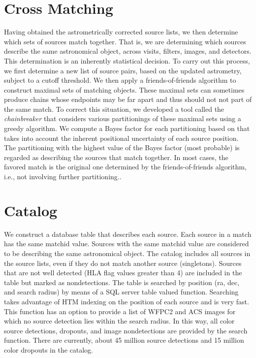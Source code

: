 \documentclass[11pt,twoside]{article}
\begin{document}
\section{Cross Matching}
Having obtained the astrometrically corrected source lists, we then determine which
sets of sources match together. That is, we are determining which sources describe
the same astronomical object, across visits, filters, images, and detectors. 
This determination is an inherently statistical decision.
To carry out this process, we first determine a new list of source pairs, based on 
the updated astrometry, subject to a cutoff threshold. %
We then apply 
a friends-of-friends algorithm to construct maximal sets of matching objects.
These maximal sets can sometimes produce chains whose endpoints
may be far apart and thus should not not part of the same match. To correct this situation,
we developed a tool called the {\it chainbreaker} that considers various partitionings
of these maximal sets using a greedy algorithm. We
compute a Bayes factor for each partitioning based on \cite{2008ApJ...679..301B} that takes into account
the inherent positional uncertainty of each source position. The partitioning with
the highest value of the Bayes factor (most probable) is regarded as describing the sources
that match together. In most cases, the favored match is the original one determined
by the friends-of-friends algorithm, i.e., not involving further partitioning.. 

\section{Catalog}
We construct a database table that describes each source. Each source in a match has the same matchid value.
Sources with the same matchid value are considered to be describing the same astronomical
object. The catalog includes all sources in the source lists, even if they do not match
another source (singletons). Sources that are not well detected (HLA flag values greater than 4)
are included in the table but marked as nondetections. The table is searched by position (ra, dec,
and search radius) by means of
a SQL server table valued function.  Searching takes advantage of HTM indexing
on the position of each source and is very fast.
This function has an option to provide a list of WFPC2 and ACS images for which no source detection
lies within the search radius. In this way, all color source detections, dropouts, and image
nondetections are provided by the search function.  There are currently, about 45 million
source detections and 15 million color dropouts in the catalog.
\end{document}
